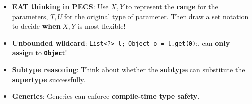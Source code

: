 \documentclass[10pt, landscape]{article}
\begin{document}
\begin{multicols}{4}
\begin{enumerate}
\begin{itemize}
        \item \textbf{EAT thinking in PECS}: Use $X, Y$ to represent the \textbf{range} for the parameters, $T, U$ for the original type of parameter. Then draw a set notation to decide \textbf{when} $X, Y$ is most flexible!
        \item \textbf{Unbounded wildcard}: \texttt{List<?> l; Object o = l.get(0)};, can \textbf{only assign} to \textbf{\texttt{Object}}!
        \item \textbf{Subtype reasoning}: Think about whether the \textbf{subtype} can substitute the \textbf{supertype} successfully.
        \item \textbf{Generics}: Generics can enforce \textbf{compile-time type safety}.
    \end{itemize}
\end{enumerate}


\end{multicols}
\end{document}
